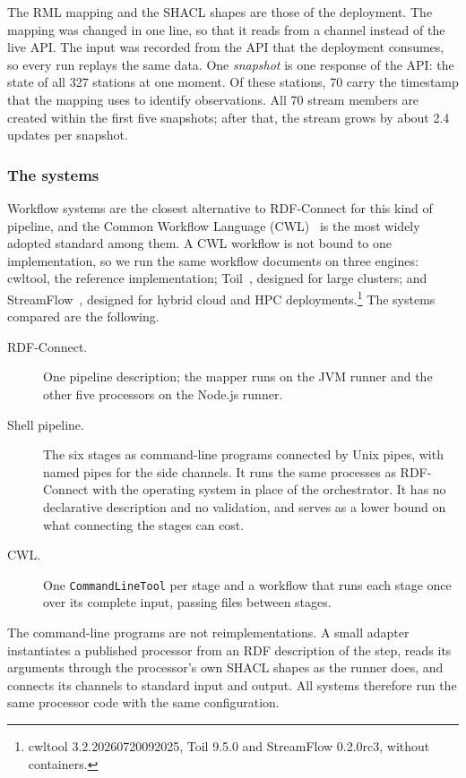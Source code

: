 The RML mapping and the SHACL shapes are those of the deployment. The mapping
was changed in one line, so that it reads from a channel instead of the live
API. The input was recorded from the API that the deployment consumes, so every
run replays the same data. One \emph{snapshot} is one response of the API: the
state of all 327 stations at one moment. Of these stations, 70 carry the
timestamp that the mapping uses to identify observations. All 70 stream members
are created within the first five snapshots; after that, the stream grows by
about 2.4 updates per snapshot.

\subsubsection{The systems}

Workflow systems are the closest alternative to RDF-Connect for this kind of
pipeline, and the Common Workflow Language (CWL)~\citep{crusoe2022cwl} is the most
widely adopted standard among them. A CWL workflow is not bound to one
implementation, so we run the same workflow documents on three engines:
cwltool, the reference implementation; Toil~\citep{vivian2017toil}, designed for large
clusters; and StreamFlow~\citep{colonnelli2021streamflow}, designed for hybrid cloud and HPC
deployments.\footnote{cwltool 3.2.20260720092025, Toil 9.5.0 and StreamFlow
0.2.0rc3, without containers.} The systems compared are the following.

\begin{description}
\item[RDF-Connect.] One pipeline description; the mapper runs on the JVM runner
  and the other five processors on the Node.js runner.
\item[Shell pipeline.] The six stages as command-line programs connected by
  Unix pipes, with named pipes for the side channels. It runs the same
  processes as RDF-Connect with the operating system in place of the
  orchestrator. It has no declarative description and no validation, and serves
  as a lower bound on what connecting the stages can cost.
\item[CWL.] One \texttt{CommandLineTool} per stage and a workflow that runs each
  stage once over its complete input, passing files between stages.
\end{description}

The command-line programs are not reimplementations. A small adapter
instantiates a published processor from an RDF description of the step, reads
its arguments through the processor's own SHACL shapes as the runner does, and
connects its channels to standard input and output. All systems therefore run
the same processor code with the same configuration.

